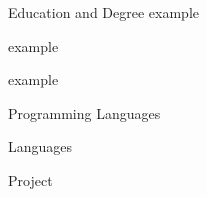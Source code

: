 \documentclass[a4paper,11pt,noweblinkbox=true,eventconfortaa]{dmCV}
\begin{document}
\name{}
\surname{}
\birth{\where{} \when{}}
\email{}
\gender{}
\nationality{}
\personaldata
\begin{eventlist}{Education and Degree}
  {\scriptsize example}

  {\scriptsize example}

  {\scriptsize example} 
 
\end{eventlist}

\begin{eventlist}{Programming Languages}
\end{eventlist}

\begin{eventlist}{Languages}
\end{eventlist}

\begin{eventlist}{Project}
  \item 
  \item
  \item
  \item
\end{eventlist}
\end{document}

